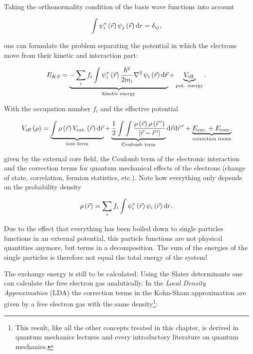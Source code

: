 Taking the orthonormality condition of the basis wave functions into account 

\begin{equation}
\int{  \psi_i^*\ensuremath{\left(\vec{r}\right)} \psi_j\ensuremath{\left(\vec{r}\right)}  \text{d}r } = \delta_{ij}, 
\end{equation}


\noindent
one can formulate the problem separating the potential in which the electrons move from their kinetic and interaction part:


\begin{equation}
E_{KS} = 
\underbrace{- \sum_i {  f_i \int{\psi_i^*\ensuremath{\left(\vec{r}\right)} \frac{\hbar^2}{2m_i}\nabla^2\, \psi_i\ensuremath{\left(\vec{r}\right)} \text{d}\vec{r}  }    } }_{\text{kinetic energy}}  + \underbrace{ V_{\text{eff.}} }_{\text{pot. energy}}.
\end{equation}


\noindent
With the occupation number $f_i$ and the effective potential


\begin{equation}
V_{\text{eff}}\left(\rho\right) =
\underbrace{\int{\rho\ensuremath{\left(\vec{r}\right)} V_{\text{ext.}}\ensuremath{\left(\vec{r}\right)}  \text{d}\vec{r} }}_{\text{ions term}} +
\underbrace{\frac{1}{2} \int\int \frac{ \rho\left(\vec{r}\right) \rho\left(\vec{r}\,'\right) }{\left|\vec{r}-\vec{r}\,'\right|} }_{\text{Coulomb term}}
\text{d}\vec{r}\text{d}\vec{r}\,' +
\underbrace{E_{\text{exc.}} + E_{\text{corr.}}}_{\text{correction terms}}
\end{equation}


\noindent
given by the external core field, the Coulomb term of the electronic interaction and the correction terms for quantum mechanical effects of the electrons (change of state, correlation, fermion statistics, etc.). Note how everything only depends on the probability density

\begin{equation}
\rho\left(\vec{r}\right) = 
\sum_i {  f_i \int{  \psi_i^*\ensuremath{\left(\vec{r}\right)} \psi_i\ensuremath{\left(\vec{r}\right)}  \text{d}r }  }.
\end{equation}



Due to the effect that everything has been boiled down to single particles functions in an external potential, this particle functions are not physical quantities  anymore, but terms in a decomposition. The sum of the energies of the single particles is therefore not equal the total energy of the system!

The exchange energy is still to be calculated. Using the Slater determinants one can calculate the free electron gas analutically. In the \emph{Local Density Approximation} (LDA) the correction terms in the Kohn-Sham approximation are given by a free electron gas with the same density\footnote{This result, like all the other concepts treated in this chapter, is derived in quantum mechanics lectures and every introductory literature on quantum mechanics.}:

